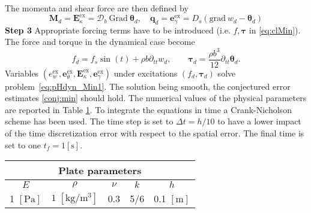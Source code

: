 The momenta and shear force are then defined by
\[
\bm{M}_d = \bm{E}_\kappa^\text{ex} =  \bm{\mathcal{D}}_b \ \mathrm{Grad} \ \bm{\theta}_d, \quad \bm{q}_d = \bm{e}_\gamma^\text{ex} = D_s(\mathrm{grad} \ w_d - \bm{\theta}_d)
\]
\textbf{Step 3 } Appropriate forcing terms have to be introduced (i.e. $f, \bm{\tau}$ in \eqref{eq:clMin}). The force and torque in the dynamical case become
\begin{equation*}
f_d = f_s \sin(t) + \rho b \partial_{tt} w_d, \qquad \bm{\tau}_d = \frac{\rho b^3}{12} \partial_{tt} \bm{\theta}_d.
\end{equation*}
Variables $(e_w^\text{ex}, \bm{e}_\theta^\text{ex}, \bm{E}_\kappa^\text{ex}, \bm{e}_\gamma^\text{ex})$ under excitations $(f_d, \bm{\tau}_d)$ solve problem~\eqref{eq:pHdyn_Min1}. The solution being smooth, the conjectured error estimates \ref{conj:min} should hold. The numerical values of the physical parameters are reported in Table \ref{tab:parMin}.  To integrate the equations in time a Crank-Nicholson scheme has been used. The time step is set to $\Delta t = h/10$ to have a lower impact of the time discretization error with respect to the spatial error. The final time is set to one $t_f = 1 [\textrm{s}]$.

\begin{table}[htb]
	\centering
	\begin{tabular}{ccccc}
		\hline 
		\multicolumn{5}{c}{Plate parameters} \\ 
		\hline 
		$E$ & $\rho$ & $\nu$ & $k$ & $h$ \\
		1 $[\textrm{Pa}]$ & $1\; [\textrm{kg}/\textrm{m}^3]$ & 0.3 & 5/6 & 0.1 $[\textrm{m}]$\\ 
		\hline 
	\end{tabular} 
	\captionsetup{width=0.95\linewidth}
	\vspace{1mm}
	\label{tab:parMin}
\end{table}

